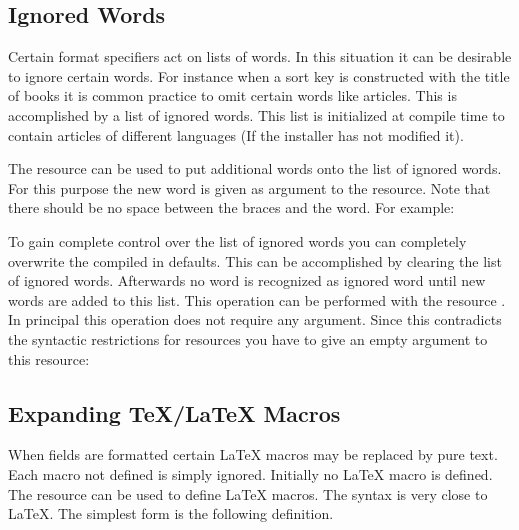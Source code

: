 \documentclass[11pt,a4paper]{scrbook}
\begin{document}
\subsection{Ignored Words}

Certain format specifiers act on lists of words. In this situation it can be
desirable to ignore certain words. For instance when a sort key is constructed
with the title of books it is common practice to omit certain words like
articles. This is accomplished by a list of ignored words. This list is
initialized at compile time to contain articles of different languages (If the
installer has not modified it).

The resource  can be used to put additional words onto the
list of ignored words. For this purpose the new word is given as argument to
the resource. Note that there should be no space between the braces and the
word. For example:

\begin{Resources}
\end{Resources}

To gain complete control over the list of ignored words you can completely
overwrite the compiled in defaults. This can be accomplished by clearing the
list of ignored words. Afterwards no word is recognized as ignored word until
new words are added to this list. This operation can be performed with the
resource . In principal this operation does not
require any argument. Since this contradicts the syntactic restrictions for
resources you have to give an empty argument to this resource:

\begin{Resources}
\end{Resources}


\subsection{Expanding \TeX/\LaTeX{} Macros}

When fields are formatted certain \LaTeX{} macros may be replaced by pure
text. Each macro not defined is simply ignored. Initially no \LaTeX{} macro is
defined. The resource  can be used to define \LaTeX{} macros.
The syntax is very close to \LaTeX. The simplest form is the following
definition.

\begin{Resources}
\end{Resources}
\end{document}
